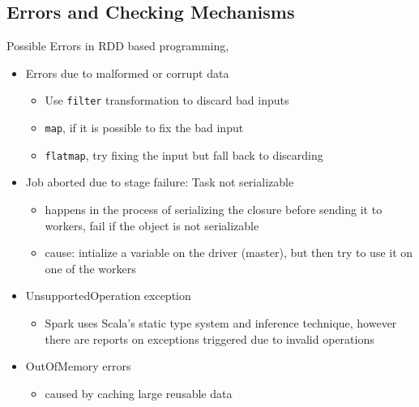 \subsection{Errors and Checking Mechanisms}
\begin{frame}
Possible Errors in RDD based programming,
\begin{itemize}
  \item Errors due to malformed or corrupt data
  	\begin{itemize}
  	  \item Use \texttt{filter} transformation to discard bad inputs
  	  \item \texttt{map}, if it is possible to fix the bad input
  	  \item \texttt{flatmap}, try fixing the input but fall back to discarding
  	\end{itemize}
  \item Job aborted due to stage failure: Task not serializable
  	\begin{itemize}
  	  \item happens in the process of serializing the closure before sending it
  	  to workers, fail if the object is not serializable
  	  \item cause: intialize a variable on the driver (master), but then try to
  	  use it on one of the workers
  	\end{itemize}
  \item UnsupportedOperation exception
  	\begin{itemize}
  	  \item Spark uses Scala's static type system and inference technique,
  	  however there are reports on exceptions triggered due to invalid operations
  	\end{itemize}
  \item OutOfMemory errors
  	\begin{itemize}
  	  \item caused by caching large reusable data
  	\end{itemize}
\end{itemize}
\end{frame}

